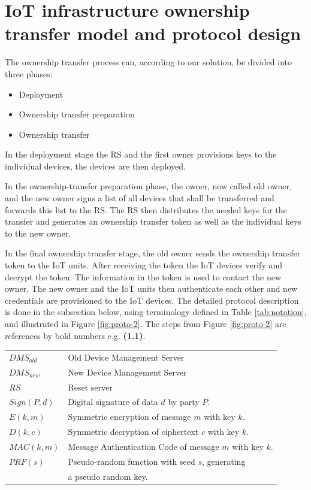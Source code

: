 {\section{IoT infrastructure ownership transfer model and protocol design}
\label{sec:ot:Solution}
The ownership transfer process can, according to our solution, be divided into three phases:
\begin{itemize}
\item Deployment
\item Ownership transfer preparation
\item Ownership transfer
\end{itemize}
In the deployment stage the RS and the first owner provisions keys to the individual devices, the devices are then deployed.

In the ownership-transfer preparation phase, the owner, now called old owner, and the new owner signs a list of all devices that shall be transferred and forwards this list to the RS. The RS then distributes the needed keys for the transfer and generates an ownership transfer token as well as the individual keys to the new owner.

In the final ownership transfer stage, the old owner sends the ownership transfer token to the IoT units. After receiving the token the IoT devices verify and decrypt the token. The information in the token is used to contact the new owner. The new owner and the IoT units then authenticate each other and new credentials are provisioned to the IoT devices. The detailed protocol description is done in the subsection below, using terminology defined in Table \ref{tab:notation}, and illustrated in Figure \ref{fig:proto-2}. The steps from Figure \ref{fig:proto-2} are references by bold numbers e.g. \textbf{(1.1)}.

\begin{table}

\begin{tabularx}{\textwidth}{l m{9cm}}
\hline
      $DMS_{old}$ & Old Device Management Server  \\
      $DMS_{new}$ & New Device Management Server  \\
      $RS$ &Reset server  \\
    
      $Sign(P, d)$ & Digital signature of data $d$ by party $P$.  \\
      $E(k,m)$  & Symmetric encryption of message $m$ with key $k$.  \\
      $D(k,c)$  & Symmetric decryption of ciphertext $c$ with key $k$.  \\
      $MAC(k,m)$  & Message Authentication Code of message $m$ with key $k$.  \\
      $PRF(s)$ & Pseudo-random function with seed $s$, generating  \\
               & a pseudo random key. \\
    

\end{tabularx}
\end{table}}
